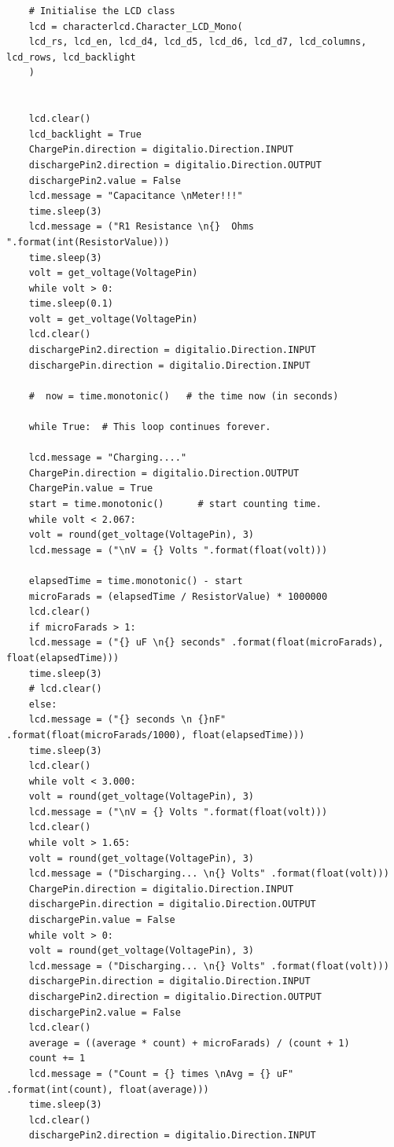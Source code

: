 \documentclass[]{article}
\begin{document}
\begin{verbatim}
	# Initialise the LCD class
	lcd = characterlcd.Character_LCD_Mono(
	lcd_rs, lcd_en, lcd_d4, lcd_d5, lcd_d6, lcd_d7, lcd_columns, lcd_rows, lcd_backlight
	)
	
	
	lcd.clear()
	lcd_backlight = True
	ChargePin.direction = digitalio.Direction.INPUT
	dischargePin2.direction = digitalio.Direction.OUTPUT
	dischargePin2.value = False
	lcd.message = "Capacitance \nMeter!!!"
	time.sleep(3)
	lcd.message = ("R1 Resistance \n{}  Ohms ".format(int(ResistorValue)))
	time.sleep(3)
	volt = get_voltage(VoltagePin)
	while volt > 0:
	time.sleep(0.1)
	volt = get_voltage(VoltagePin)
	lcd.clear()
	dischargePin2.direction = digitalio.Direction.INPUT
	dischargePin.direction = digitalio.Direction.INPUT
	
	#  now = time.monotonic()   # the time now (in seconds)
	
	while True:  # This loop continues forever.
	
	lcd.message = "Charging...."
	ChargePin.direction = digitalio.Direction.OUTPUT
	ChargePin.value = True
	start = time.monotonic()      # start counting time.
	while volt < 2.067:
	volt = round(get_voltage(VoltagePin), 3)
	lcd.message = ("\nV = {} Volts ".format(float(volt)))
	
	elapsedTime = time.monotonic() - start
	microFarads = (elapsedTime / ResistorValue) * 1000000
	lcd.clear()
	if microFarads > 1:
	lcd.message = ("{} uF \n{} seconds" .format(float(microFarads), float(elapsedTime)))
	time.sleep(3)
	# lcd.clear()
	else:
	lcd.message = ("{} seconds \n {}nF" .format(float(microFarads/1000), float(elapsedTime)))
	time.sleep(3)
	lcd.clear()
	while volt < 3.000:
	volt = round(get_voltage(VoltagePin), 3)
	lcd.message = ("\nV = {} Volts ".format(float(volt)))
	lcd.clear()
	while volt > 1.65:
	volt = round(get_voltage(VoltagePin), 3)
	lcd.message = ("Discharging... \n{} Volts" .format(float(volt)))
	ChargePin.direction = digitalio.Direction.INPUT
	dischargePin.direction = digitalio.Direction.OUTPUT
	dischargePin.value = False
	while volt > 0:
	volt = round(get_voltage(VoltagePin), 3)
	lcd.message = ("Discharging... \n{} Volts" .format(float(volt)))
	dischargePin.direction = digitalio.Direction.INPUT
	dischargePin2.direction = digitalio.Direction.OUTPUT
	dischargePin2.value = False
	lcd.clear()
	average = ((average * count) + microFarads) / (count + 1)
	count += 1
	lcd.message = ("Count = {} times \nAvg = {} uF" .format(int(count), float(average)))
	time.sleep(3)
	lcd.clear()
	dischargePin2.direction = digitalio.Direction.INPUT
	

\end{verbatim}
\end{document}
